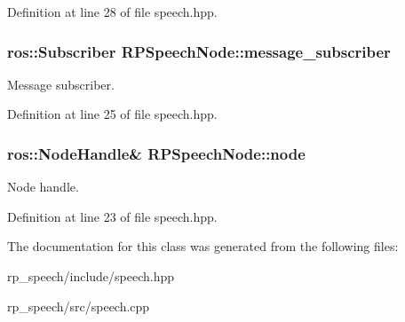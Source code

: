 \-Definition at line 28 of file speech.\-hpp.

\hypertarget{class_r_p_speech_node_acf4df4dff2ce25e1faf20b3285ff9336}{
\subsubsection[{message\-\_\-subscriber}]{\setlength{\rightskip}{0pt plus 5cm}ros\-::\-Subscriber {\bf \-R\-P\-Speech\-Node\-::message\-\_\-subscriber}}}\label{class_r_p_speech_node_acf4df4dff2ce25e1faf20b3285ff9336}
\-Message subscriber. 

\-Definition at line 25 of file speech.\-hpp.

\hypertarget{class_r_p_speech_node_a362cd1f0bb881c0dfc2fed8c9d21250c}{
\subsubsection[{node}]{\setlength{\rightskip}{0pt plus 5cm}ros\-::\-Node\-Handle\& {\bf \-R\-P\-Speech\-Node\-::node}}}\label{class_r_p_speech_node_a362cd1f0bb881c0dfc2fed8c9d21250c}
\-Node handle. 

\-Definition at line 23 of file speech.\-hpp.



\-The documentation for this class was generated from the following files\-:\begin{DoxyCompactItemize}
\item 
rp\-\_\-speech/include/speech.\-hpp\item 
rp\-\_\-speech/src/speech.\-cpp\end{DoxyCompactItemize}

